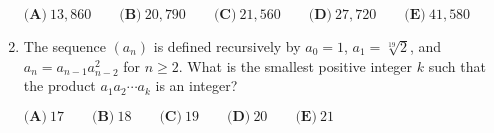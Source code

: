 \documentclass{article}
\begin{document}
\begin{enumerate}[label=\arabic*., itemsep=0.5em]
\(\textbf{(A)}\ 13,860\qquad\textbf{(B)}\ 20,790\qquad\textbf{(C)}\ 21,560 \qquad\textbf{(D)}\ 27,720 \qquad\textbf{(E)}\ 41,580\)\par \vspace{0.5em}\item The sequence \((a_n)\) is defined recursively by \(a_0=1\), \(a_1=\sqrt[19]{2}\), and \(a_n=a_{n-1}a_{n-2}^2\) for \(n\geq 2\). What is the smallest positive integer \(k\) such that the product \(a_1a_2\cdots a_k\) is an integer?

\(\textbf{(A)}\ 17\qquad\textbf{(B)}\ 18\qquad\textbf{(C)}\ 19\qquad\textbf{(D)}\ 20\qquad\textbf{(E)}\ 21\)\par \vspace{0.5em}\end{enumerate}
\end{document}

